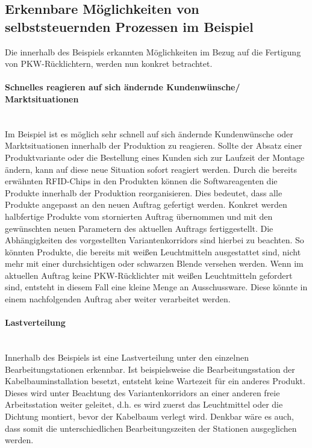\subsection{Erkennbare Möglichkeiten von selbststeuernden Prozessen im Beispiel}
\label{sec:Moeglichkeiten}

Die innerhalb des Beispiels erkannten Möglichkeiten im Bezug auf die Fertigung
von PKW-Rücklichtern, werden nun konkret betrachtet.

\paragraph{Schnelles reagieren auf sich ändernde Kundenwünsche/ Marktsituationen} \hfill \\
Im Beispiel ist es möglich sehr schnell auf sich ändernde Kundenwünsche oder
Marktsituationen innerhalb der Produktion zu reagieren. Sollte der Absatz einer
Produktvariante oder die Bestellung eines Kunden sich zur Laufzeit der Montage
ändern, kann auf diese neue Situation sofort reagiert werden. Durch die bereits
erwähnten RFID-Chips in den Produkten können die Softwareagenten die Produkte
innerhalb der Produktion reorganisieren. Dies bedeutet, dass alle Produkte
angepasst an den neuen Auftrag gefertigt werden. Konkret werden halbfertige
Produkte vom stornierten Auftrag übernommen und mit den gewünschten neuen
Parametern des aktuellen Auftrags fertiggestellt. Die Abhängigkeiten des
vorgestellten Variantenkorridors sind hierbei zu beachten. So könnten Produkte,
die bereits mit weißen Leuchtmitteln ausgestattet sind, nicht mehr mit einer
durchsichtigen oder schwarzen Blende versehen werden. Wenn im aktuellen Auftrag
keine PKW-Rücklichter mit weißen Leuchtmitteln gefordert sind, entsteht in
diesem Fall eine kleine Menge an Ausschussware. Diese könnte in einem
nachfolgenden Auftrag aber weiter verarbeitet werden.

\paragraph{Lastverteilung} \hfill \\
Innerhalb des Beispiels ist eine Lastverteilung unter den einzelnen
Bearbeitungstationen erkennbar. Ist beispielsweise die Bearbeitungsstation der
Kabelbauminstallation besetzt, entsteht keine Wartezeit für ein anderes Produkt.
Dieses wird unter Beachtung des Variantenkorridors an einer anderen freie
Arbeitsstation weiter geleitet, d.h. es wird zuerst das Leuchtmittel oder die
Dichtung montiert, bevor der Kabelbaum verlegt wird. Denkbar wäre es auch, dass
somit die unterschiedlichen Bearbeitungszeiten der Stationen ausgeglichen
werden.

